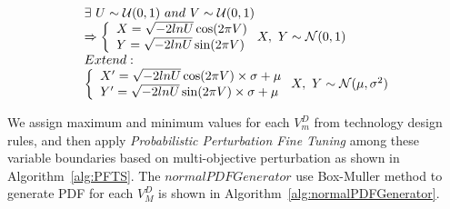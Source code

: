   \begin{align}{\label{eq:BoxMullerEq}}
    \begin{array}{l}
      \exists \ U\sim\mathcal{U}(0,1)\ and\ V\sim\mathcal{U}(0,1)\\
      \Rightarrow \left\{
      \begin{array}{l}
        X=\sqrt{-2lnU}\cos(2\pi V)\\
        Y=\sqrt{-2lnU}\sin(2\pi V)\\
      \end{array}
      \right .
      X,\ Y\sim\mathcal{N}(0,1)\\
      Extend:\\
      \left\{
      \begin{array}{l}
        X'=\sqrt{-2lnU}\cos(2\pi V)\times \sigma+\mu\\
        Y'=\sqrt{-2lnU}\sin(2\pi V)\times \sigma+\mu\\
      \end{array}
      \right .
      X,\ Y\sim\mathcal{N}(\mu,\sigma^2)\\
    \end{array}
  \end{align} 

  


  We assign maximum and minimum values for each $V^D_m$ from technology design rules, and then apply {\it Probabilistic Perturbation Fine Tuning} among these variable boundaries based on multi-objective perturbation as shown in Algorithm~\ref{alg:PFTS}. The $normalPDFGenerator$ use Box-Muller method to generate PDF for each $V^D_M$ is shown in Algorithm~\ref{alg:normalPDFGenerator}.


